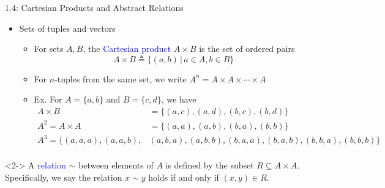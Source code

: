 \documentclass[10pt,english,aspectratio=169,handout]{beamer}
\begin{document}
\begin{frame}{1.4: Cartesian Products and Abstract Relations}

\vspace{-2mm}

\begin{itemize}
\setlength\itemsep{3mm}

\item<1-> Sets of tuples and vectors \vspace{1mm}
\begin{itemize}
  \setlength\itemsep{1.5mm}
  \item For sets $A,B$, the \textcolor{blue}{Cartesian product} $A\times B$ is the set of ordered pairs \[ A \times B \triangleq \{(a,b) \,|\, a\in A, b\in B\}\]
  \item For $n$-tuples from the same set, we write $A^n=A\times A \times \cdots \times A$
  \item Ex. For $A  = \{ a,b \}$ and $B  = \{ c,d \}$, we have
\begin{align*}
A\times B &= \{(a,c),(a,d),(b,c),(b,d) \} \\
A^2 = A \times A &= \{ (a,a),(a,b),(b,a),(b,b) \} \\
\!\!\!\!\!\!\!\!\!\!\!\!\!\!\!\!\!\!\! A^3 = \{ (a,a,a),(a,a,b),&(a,b,a),(a,b,b),(b,a,a),(b,a,b),(b,b,a),(b,b,b) \} \\
\end{align*}
\end{itemize}
\end{itemize}
\vspace{-7mm}

\begin{definition}<2->
A \textcolor{blue}{relation} $\sim$ between elements of $A$ is defined by the subset $R \subseteq A\times A$.  Specifically, we say the relation $x \sim y$ holds if and only if $(x,y)\in R$.
\end{definition}



\end{frame}
\end{document}
